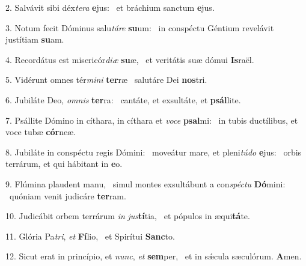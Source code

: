 2. Salvávit sibi déx\textit{te}\textit{ra} \textbf{e}jus: \ast\  et bráchium sanctum \textbf{e}jus.\

3. Notum fecit Dóminus salu\textit{tá}\textit{re} \textbf{su}um: \ast\  in conspéctu Géntium revelávit justítiam \textbf{su}am.\

4. Recordátus est misericór\textit{di}\textit{æ} \textbf{su}æ, \ast\  et veritátis suæ dómui \textbf{Is}raël.\

5. Vidérunt omnes tér\textit{mi}\textit{ni} \textbf{ter}ræ \ast\  salutáre Dei \textbf{nos}tri.\

6. Jubiláte Deo, \textit{om}\textit{nis} \textbf{ter}ra: \ast\  cantáte, et exsultáte, et \textbf{psál}lite.\

7. Psállite Dómino in cíthara, in cíthara et \textit{vo}\textit{ce} \textbf{psal}mi: \ast\  in tubis ductílibus, et voce tubæ \textbf{cór}neæ.\

8. Jubiláte in conspéctu regis Dómini: \dag\  moveátur mare, et pleni\textit{tú}\textit{do} \textbf{e}jus: \ast\  orbis terrárum, et qui hábitant in \textbf{e}o.\

9. Flúmina plaudent manu, \dag\  simul montes exsultábunt a con\textit{spéc}\textit{tu} \textbf{Dó}mini: \ast\  quóniam venit judicáre \textbf{ter}ram.\

10. Judicábit orbem terrárum \textit{in} \textit{jus}\textbf{tí}tia, \ast\  et pópulos in æqui\textbf{tá}te.\

11. Glória Pa\textit{tri}, \textit{et} \textbf{Fí}lio, \ast\  et Spirítui \textbf{Sanc}to.\

12. Sicut erat in princípio, et \textit{nunc}, \textit{et} \textbf{sem}per, \ast\  et in sǽcula sæculórum. \textbf{A}men.\

